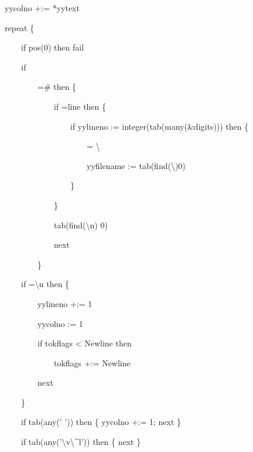{\ttfamily\mdseries
\ \ \ yycolno +:= *yytext}


\bigskip

{\ttfamily\mdseries
\ \ \ repeat \{}

{\ttfamily\mdseries
\ \ \ \ \ \ \ if pos(0) then fail}

{\ttfamily\mdseries
\ \ \ \ \ \ \ if }

{\ttfamily\mdseries
\ \ \ \ \ \ \ \ \ \ \ ={\textquotedbl}\#{\textquotedbl} then \{}

{\ttfamily\mdseries
\ \ \ \ \ \ \ \ \ \ \ \ \ \ \ if ={\textquotedbl}line {\textquotedbl} then \{}

{\ttfamily\mdseries
\ \ \ \ \ \ \ \ \ \ \ \ \ \ \ \ \ \ \ if yylineno := integer(tab(many(\&digits))) then \{}

{\ttfamily\mdseries
\ \ \ \ \ \ \ \ \ \ \ \ \ \ \ \ \ \ \ \ \ \ \ ={\textquotedbl} {\textbackslash}{\textquotedbl}{\textquotedbl}}

{\ttfamily\mdseries
\ \ \ \ \ \ \ \ \ \ \ \ \ \ \ \ \ \ \ \ \ \ \ yyfilename :=
tab(find({\textquotedbl}{\textbackslash}{\textquotedbl}{\textquotedbl}){\textbar}0)}

{\ttfamily\mdseries
\ \ \ \ \ \ \ \ \ \ \ \ \ \ \ \ \ \ \ \}}

{\ttfamily\mdseries
\ \ \ \ \ \ \ \ \ \ \ \ \ \ \ \}}

{\ttfamily\mdseries
\ \ \ \ \ \ \ \ \ \ \ \ \ \ \ tab(find({\textquotedbl}{\textbackslash}n{\textquotedbl}) {\textbar} 0)}

{\ttfamily\mdseries
\ \ \ \ \ \ \ \ \ \ \ \ \ \ \ next}

{\ttfamily\mdseries
\ \ \ \ \ \ \ \ \ \ \ \}}

{\ttfamily\mdseries
\ \ \ \ \ \ \ if ={\textquotedbl}{\textbackslash}n{\textquotedbl} then \{}

{\ttfamily\mdseries
\ \ \ \ \ \ \ \ \ \ \ yylineno +:= 1}

{\ttfamily\mdseries
\ \ \ \ \ \ \ \ \ \ \ yycolno := 1}

{\ttfamily\mdseries
\ \ \ \ \ \ \ \ \ \ \ if tokflags {\textless} Newline then}

{\ttfamily\mdseries
\ \ \ \ \ \ \ \ \ \ \ \ \ \ \ tokflags +:= Newline}

{\ttfamily\mdseries
\ \ \ \ \ \ \ \ \ \ \ next}

{\ttfamily\mdseries
\ \ \ \ \ \ \ \}}

{\ttfamily\mdseries
\ \ \ \ \ \ \ if tab(any(' ')) then \{ yycolno +:= 1; next \}}

{\ttfamily\mdseries
\ \ \ \ \ \ \ if tab(any('{\textbackslash}v{\textbackslash}\^{}l')) then \{ next \}}

